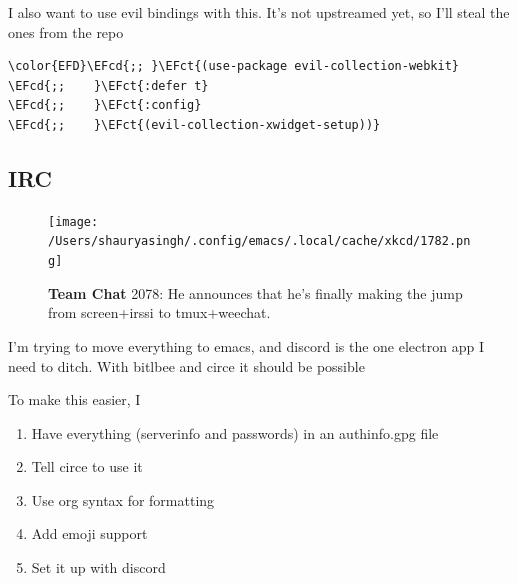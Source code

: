 \documentclass{scrartcl}
\newcommand{\EFct}[1]{\textcolor{EFct}{#1}} %
\newcommand{\EFcd}[1]{\textcolor{EFcd}{#1}} %
\begin{document}
I also want to use evil bindings with this. It's not upstreamed yet, so I'll steal the ones from the repo
\begin{Code}
\begin{Verbatim}[]
\color{EFD}\EFcd{;; }\EFct{(use-package evil-collection-webkit}
\EFcd{;;    }\EFct{:defer t}
\EFcd{;;    }\EFct{:config}
\EFcd{;;    }\EFct{(evil-collection-xwidget-setup))}
\end{Verbatim}
\end{Code}

\subsection{IRC}
\label{sec:org205f80f}
\begin{figure}[!htb]
    \centering
    \texttt{[image: /Users/shauryasingh/.config/emacs/.local/cache/xkcd/1782.png]}
  \caption*{\label{xkcd:1782} \textbf{Team Chat} 2078: He announces that he's finally making the jump from screen+irssi to tmux+weechat.}
  \end{figure}

I'm trying to move everything to emacs, and discord is the one electron app I
need to ditch. With bitlbee and circe it should be possible

To make this easier, I

\begin{enumerate}
\item Have everything (serverinfo and passwords) in an authinfo.gpg file
\item Tell circe to use it
\item Use org syntax for formatting
\item Add emoji support
\item Set it up with discord
\end{enumerate}
\end{document}
